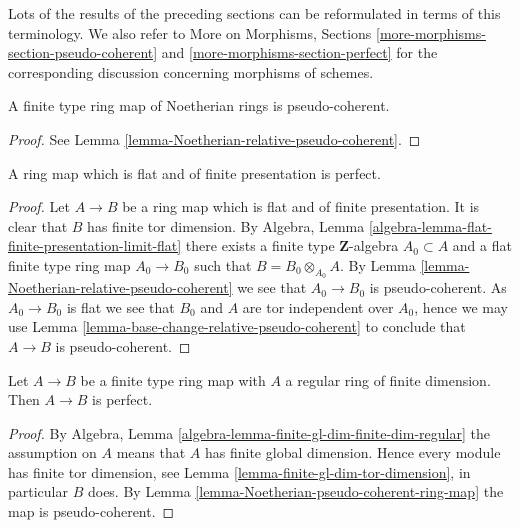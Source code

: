 \noindent
Lots of the results of the preceding sections can be reformulated
in terms of this terminology. We  also refer to
More on Morphisms, Sections \ref{more-morphisms-section-pseudo-coherent}
and \ref{more-morphisms-section-perfect}
for the corresponding discussion concerning morphisms of schemes.

\begin{lemma}
\label{lemma-Noetherian-pseudo-coherent-ring-map}
A finite type ring map of Noetherian rings is pseudo-coherent.
\end{lemma}

\begin{proof}
See
Lemma \ref{lemma-Noetherian-relative-pseudo-coherent}.
\end{proof}

\begin{lemma}
\label{lemma-flat-finite-presentation-perfect}
A ring map which is flat and of finite presentation is perfect.
\end{lemma}

\begin{proof}
Let $A \to B$ be a ring map which is flat and of finite presentation.
It is clear that $B$ has finite tor dimension. By
Algebra, Lemma \ref{algebra-lemma-flat-finite-presentation-limit-flat}
there exists a finite type $\mathbf{Z}$-algebra $A_0 \subset A$
and a flat finite type ring map $A_0 \to B_0$ such that
$B = B_0 \otimes_{A_0} A$. By
Lemma \ref{lemma-Noetherian-relative-pseudo-coherent}
we see that $A_0 \to B_0$ is pseudo-coherent.
As $A_0 \to B_0$ is flat we see that $B_0$ and $A$ are tor independent
over $A_0$, hence we may use
Lemma \ref{lemma-base-change-relative-pseudo-coherent}
to conclude that $A \to B$ is pseudo-coherent.
\end{proof}

\begin{lemma}
\label{lemma-regular-perfect-ring-map}
Let $A \to B$ be a finite type ring map with $A$ a regular ring
of finite dimension. Then $A \to B$ is perfect.
\end{lemma}

\begin{proof}
By
Algebra, Lemma \ref{algebra-lemma-finite-gl-dim-finite-dim-regular}
the assumption on $A$ means that $A$ has finite global dimension.
Hence every module has finite tor dimension, see
Lemma \ref{lemma-finite-gl-dim-tor-dimension},
in particular $B$ does. By
Lemma \ref{lemma-Noetherian-pseudo-coherent-ring-map}
the map is pseudo-coherent.
\end{proof}

